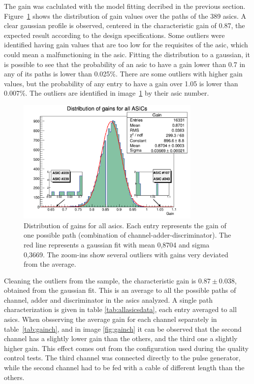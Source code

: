 \documentclass[main.tex]{subfiles}
\begin{document}
The gain was caclulated with the model fitting decribed in the previous section. Figure~\ref{fig:gaindist} shows the distribution of gain values over the paths of the 389 asics. A clear gaussian profile is observed, centered in the characteristic gain of 0.87, the expected result according to the design specifications. Some outliers were identified having gain values that are too low for the requisites of the \gls{asic}, which could mean a malfunctioning in the \gls{asic}. Fitting the distribution to a gaussian, it is possible to see that the probability of an \gls{asic} to have a gain lower than 0.7 in any of its paths is lower than 0.025\%. There are some outliers with higher gain values, but the probability of any entry to have a gain over 1.05 is lower than 0.007\%. The outliers are identified in image~\ref{fig:gaindist} by their \gls{asic} number.
\\
\begin{figure}
  \centering
  \includegraphics[width=0.8\textwidth]{./Pictures/gaindistribution.pdf}
  \caption{Distribution of gains for all \glspl{asic}. Each entry represents the gain of one possible path (combination of channel-adder-discriminator). The red line represents a gaussian fit with mean 0,8704 and sigma 0,3669.
    The zoom-ins show several outliers with gains very deviated from the average.}
  \label{fig:gaindist}
\end{figure}

Cleaning the outliers from the sample, the characteristic gain is $0.87 \pm 0.038$, obtained from the gaussian fit. This is an average to all the possible paths of channel, adder and discriminator in the \glspl{asic} analyzed. A single path characterization is given in table \ref{tab:allasicsdata}, each entry averaged to all \glspl{asic}.
When obsserving the average gain for each channel separately in table~\ref{tab:gainch}, and in image \ref{fig:gainch} it can be observed that the second channel has a slightly lower gain than the others, and the third one a slightly higher gain. This effect comes out from the configuration used during the quality control tests. The third channel was connected directly to the pulse generator, while the second channel had to be fed with a cable of different length than the others.
\end{document}
